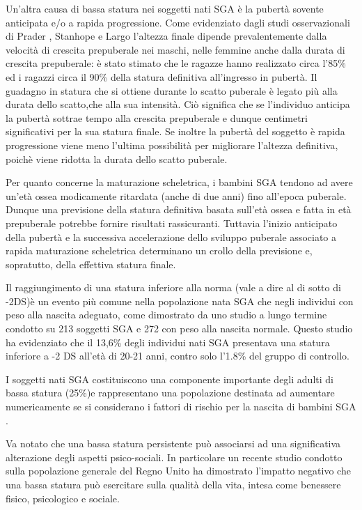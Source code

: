 Un'altra causa di bassa statura nei soggetti nati SGA è la pubertà sovente anticipata e/o a rapida progressione\cite{albertsson2000children}.%
Come evidenziato dagli studi osservazionali di Prader\cite{gasser1985human}
, Stanhope%
e Largo%
 l'altezza finale dipende prevalentemente dalla velocità di crescita prepuberale nei maschi, nelle femmine anche dalla durata di crescita prepuberale: è stato stimato che le ragazze hanno realizzato circa l'85\% ed i ragazzi circa il 90\% della statura definitiva all'ingresso in pubertà. Il guadagno in statura che si ottiene durante lo scatto puberale è legato più alla durata dello scatto,che alla sua intensità. Ciò significa che se l'individuo anticipa la pubertà sottrae tempo alla crescita prepuberale e dunque centimetri significativi per la sua statura finale. Se inoltre la pubertà del soggetto è rapida progressione viene meno l'ultima possibilità per migliorare l'altezza definitiva, poichè viene ridotta la durata dello scatto puberale.
 

Per quanto concerne la maturazione scheletrica, i bambini SGA tendono ad avere un'età ossea modicamente ritardata (anche di due anni) fino all'epoca puberale. Dunque una previsione della statura definitiva basata sull'età ossea e fatta in età prepuberale potrebbe fornire risultati rassicuranti. Tuttavia l'inizio anticipato della pubertà e la successiva accelerazione dello sviluppo puberale associato a rapida maturazione scheletrica determinano un crollo della previsione e, sopratutto, della effettiva statura finale\cite{job1986histoire}.

Il raggiungimento di una statura inferiore alla norma (vale a dire al di sotto di -2DS)è un evento più comune nella popolazione nata SGA che negli individui con peso alla nascita adeguato, come dimostrato da uno studio a lungo termine condotto su 213 soggetti SGA e 272 con peso alla nascita normale. Questo studio ha evidenziato che il 
13,6\% degli individui nati SGA presentava una statura inferiore a -2 DS all'età di
20-21 anni, contro solo l'1.8\% del gruppo di controllo.\cite{leger1997reduced}

I soggetti nati SGA costituiscono una componente importante degli adulti di bassa statura (25\%)e rappresentano una popolazione destinata ad aumentare numericamente se si considerano i fattori di rischio per la nascita di bambini SGA .

Va notato che una bassa statura persistente può associarsi ad una significativa alterazione degli aspetti psico-sociali. In particolare un recente studio condotto sulla popolazione generale del Regno Unito ha dimostrato l'impatto negativo che una bassa statura può esercitare sulla qualità della vita, intesa come benessere fisico, psicologico e sociale\cite{christensen2007evaluation}. 
